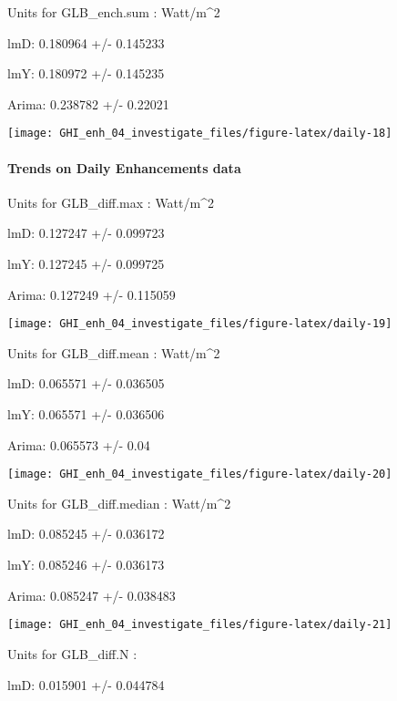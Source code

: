 \documentclass[
  10pt,
  a4paper,oneside]{article}
\begin{document}
Units for GLB\_ench.sum : Watt/m\^{}2

lmD: 0.180964 +/- 0.145233

lmY: 0.180972 +/- 0.145235

Arima: 0.238782 +/- 0.22021

\begin{center}\texttt{[image: GHI\_enh\_04\_investigate\_files/figure-latex/daily-18]} \end{center}

\newpage

\hypertarget{trends-on-daily-enhancements-data}{%
\paragraph{Trends on Daily Enhancements data}\label{trends-on-daily-enhancements-data}}

Units for GLB\_diff.max : Watt/m\^{}2

lmD: 0.127247 +/- 0.099723

lmY: 0.127245 +/- 0.099725

Arima: 0.127249 +/- 0.115059

\begin{center}\texttt{[image: GHI\_enh\_04\_investigate\_files/figure-latex/daily-19]} \end{center}

Units for GLB\_diff.mean : Watt/m\^{}2

lmD: 0.065571 +/- 0.036505

lmY: 0.065571 +/- 0.036506

Arima: 0.065573 +/- 0.04

\begin{center}\texttt{[image: GHI\_enh\_04\_investigate\_files/figure-latex/daily-20]} \end{center}

Units for GLB\_diff.median : Watt/m\^{}2

lmD: 0.085245 +/- 0.036172

lmY: 0.085246 +/- 0.036173

Arima: 0.085247 +/- 0.038483

\begin{center}\texttt{[image: GHI\_enh\_04\_investigate\_files/figure-latex/daily-21]} \end{center}

Units for GLB\_diff.N :

lmD: 0.015901 +/- 0.044784
\end{document}
